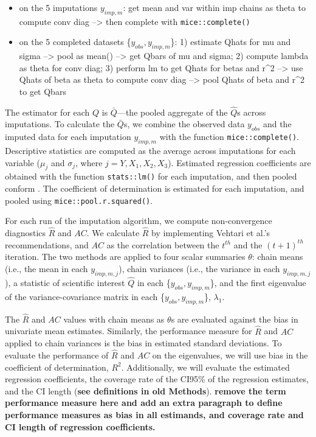 \documentclass[Royal,times,sageh]{sagej}
\begin{document}
\begin{itemize}
\item
  on the 5 imputations \(y_{imp,m}\): get mean and var within imp chains
  as theta to compute conv diag --\textgreater{} then complete with
  \texttt{mice::complete()}
\item
  on the 5 completed datasets \{\(y_{obs}, y_{imp, m}\)\}: 1) estimate
  Qhats for mu and sigma --\textgreater{} pool as mean()
  --\textgreater{} get Qbars of mu and sigma; 2) compute lambda as theta
  for conv diag; 3) perform lm to get Qhats for betas and r\^{}2
  --\textgreater{} use Qhats of beta as theta to compute conv diag
  --\textgreater{} pool Qhats of beta and r\^{}2 to get Qbars
\end{itemize}

The estimator for each \(Q\) is \(\bar{Q}\)---the pooled aggregate of
the \(\hat{Q}\)s across imputations. To calculate the \(\bar{Q}\)s, we
combine the observed data \(y_{obs}\) and the imputed data for each
imputation \(y_{imp,m}\) with the function \texttt{mice::complete()}.
Descriptive statistics are computed as the average across imputations
for each variable (\(\mu_j\) and \(\sigma_j\), where
\(j = Y, X_1, X_2, X_3\)). Estimated regression coefficients are
obtained with the function \texttt{stats::lm()} for each imputation, and
then pooled conform \citet{vink14}. The coefficient of determination is
estimated for each imputation, and pooled using
\texttt{mice::pool.r.squared()}.

For each run of the imputation algorithm, we compute non-convergence
diagnostics \(\widehat{R}\) and \(AC\). We calculate \(\widehat{R}\) by
implementing Vehtari et al.'s \citeyearpar{veht19} recommendations, and
\(AC\) as the correlation between the \(t^{th}\) and the \((t+1)^{th}\)
iteration. The two methods are applied to four scalar summaries
\(\theta\): chain means (i.e., the mean in each \(y_{imp, m, j}\)),
chain variances (i.e., the variance in each \(y_{imp, m, j}\)), a
statistic of scientific interest \(\hat{Q}\) in each
\{\(y_{obs}, y_{imp, m}\)\}, and the first eigenvalue of the
variance-covariance matrix in each \{\(y_{obs}, y_{imp, m}\)\},
\(\lambda_1\).

The \(\widehat{R}\) and \(AC\) values with chain means as \(\theta\)s
are evaluated against the bias in univariate mean estimates. Similarly,
the performance measure for \(\widehat{R}\) and \(AC\) applied to chain
variances is the bias in estimated standard deviations. To evaluate the
performance of \(\widehat{R}\) and \(AC\) on the eigenvalues, we will
use bias in the coefficient of determination, \(R^2\). Additionally, we
will evaluate the estimated regression coefficients, the coverage rate
of the CI95\% of the regression estimates, and the CI length
(\textbf{see definitions in old Methods}). \textbf{remove the term
performance measure here and add an extra paragraph to define
performance measures as bias in all estimands, and coverage rate and CI
length of regression coefficients.}
\end{document}
